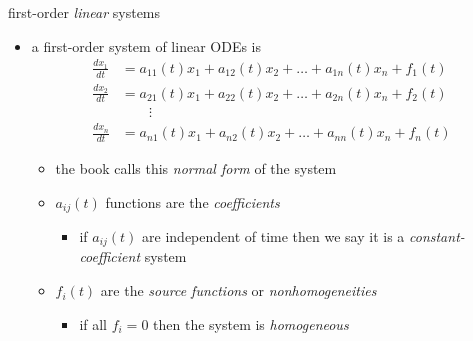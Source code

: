 \documentclass[urlcolor=blue,dvipsnames]{beamer}
\begin{document}
\begin{frame}{first-order \emph{linear} systems}

\begin{itemize}
\item a \alert{first-order system of linear ODEs} is
\begin{align*}
\frac{dx_1}{dt} &= a_{11}(t) x_1 + a_{12}(t) x_2 + \dots + a_{1n}(t) x_n + f_1(t) \\
\frac{dx_2}{dt} &= a_{21}(t) x_1 + a_{22}(t) x_2 + \dots + a_{2n}(t) x_n + f_2(t) \\
                &\qquad \vdots \\
\frac{dx_n}{dt} &= a_{n1}(t) x_1 + a_{n2}(t) x_2 + \dots + a_{nn}(t) x_n + f_n(t)
\end{align*}
     \begin{itemize}
     \item the book calls this \emph{normal form} of the system
     \item $a_{ij}(t)$ functions are the \emph{coefficients}
         \begin{itemize}
         \item if $a_{ij}(t)$ are independent of time then we say it is a \emph{constant-coefficient} system
         \end{itemize}
     \item $f_i(t)$ are the \emph{source functions} or \emph{nonhomogeneities}
         \begin{itemize}
         \item if all $f_i=0$ then the system is \emph{homogeneous}
         \end{itemize}
     \end{itemize}
\end{itemize}
\end{frame}
\end{document}
